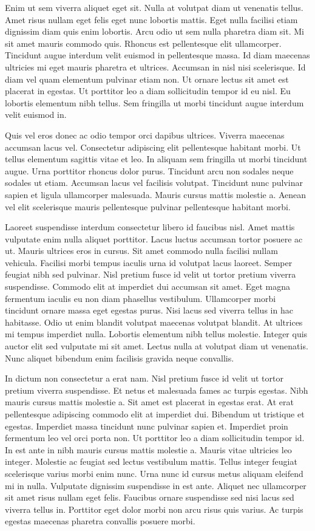 \documentclass[11pt,a4paper]{article}
\begin{document}
Enim ut sem viverra aliquet eget sit. Nulla at volutpat diam ut venenatis tellus. Amet risus nullam eget felis eget nunc lobortis mattis. Eget nulla facilisi etiam dignissim diam quis enim lobortis. Arcu odio ut sem nulla pharetra diam sit. Mi sit amet mauris commodo quis. Rhoncus est pellentesque elit ullamcorper. Tincidunt augue interdum velit euismod in pellentesque massa. Id diam maecenas ultricies mi eget mauris pharetra et ultrices. Accumsan in nisl nisi scelerisque. Id diam vel quam elementum pulvinar etiam non. Ut ornare lectus sit amet est placerat in egestas. Ut porttitor leo a diam sollicitudin tempor id eu nisl. Eu lobortis elementum nibh tellus. Sem fringilla ut morbi tincidunt augue interdum velit euismod in.

Quis vel eros donec ac odio tempor orci dapibus ultrices. Viverra maecenas accumsan lacus vel. Consectetur adipiscing elit pellentesque habitant morbi. Ut tellus elementum sagittis vitae et leo. In aliquam sem fringilla ut morbi tincidunt augue. Urna porttitor rhoncus dolor purus. Tincidunt arcu non sodales neque sodales ut etiam. Accumsan lacus vel facilisis volutpat. Tincidunt nunc pulvinar sapien et ligula ullamcorper malesuada. Mauris cursus mattis molestie a. Aenean vel elit scelerisque mauris pellentesque pulvinar pellentesque habitant morbi.

Laoreet suspendisse interdum consectetur libero id faucibus nisl. Amet mattis vulputate enim nulla aliquet porttitor. Lacus luctus accumsan tortor posuere ac ut. Mauris ultrices eros in cursus. Sit amet commodo nulla facilisi nullam vehicula. Facilisi morbi tempus iaculis urna id volutpat lacus laoreet. Semper feugiat nibh sed pulvinar. Nisl pretium fusce id velit ut tortor pretium viverra suspendisse. Commodo elit at imperdiet dui accumsan sit amet. Eget magna fermentum iaculis eu non diam phasellus vestibulum. Ullamcorper morbi tincidunt ornare massa eget egestas purus. Nisi lacus sed viverra tellus in hac habitasse. Odio ut enim blandit volutpat maecenas volutpat blandit. At ultrices mi tempus imperdiet nulla. Lobortis elementum nibh tellus molestie. Integer quis auctor elit sed vulputate mi sit amet. Lectus nulla at volutpat diam ut venenatis. Nunc aliquet bibendum enim facilisis gravida neque convallis.

In dictum non consectetur a erat nam. Nisl pretium fusce id velit ut tortor pretium viverra suspendisse. Et netus et malesuada fames ac turpis egestas. Nibh mauris cursus mattis molestie a. Sit amet est placerat in egestas erat. At erat pellentesque adipiscing commodo elit at imperdiet dui. Bibendum ut tristique et egestas. Imperdiet massa tincidunt nunc pulvinar sapien et. Imperdiet proin fermentum leo vel orci porta non. Ut porttitor leo a diam sollicitudin tempor id. In est ante in nibh mauris cursus mattis molestie a. Mauris vitae ultricies leo integer. Molestie ac feugiat sed lectus vestibulum mattis. Tellus integer feugiat scelerisque varius morbi enim nunc. Urna nunc id cursus metus aliquam eleifend mi in nulla. Vulputate dignissim suspendisse in est ante. Aliquet nec ullamcorper sit amet risus nullam eget felis. Faucibus ornare suspendisse sed nisi lacus sed viverra tellus in. Porttitor eget dolor morbi non arcu risus quis varius. Ac turpis egestas maecenas pharetra convallis posuere morbi.
\end{document}
